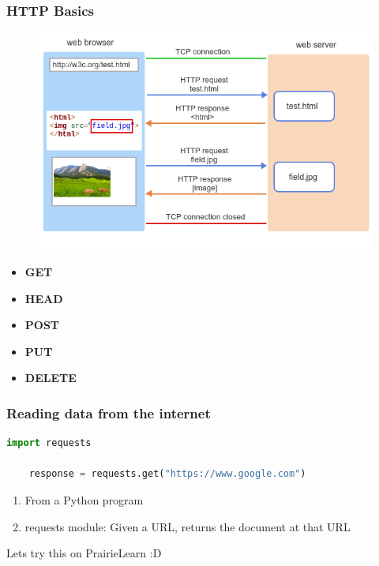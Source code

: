 \documentclass{beamer}
\begin{document}
%
%
\begin{frame}[fragile]
    \frametitle{HTTP Basics}
    \begin{minipage}{0.49\textwidth}
        \begin{figure}
            \includegraphics[width=\textwidth]{./imgs/httprequest.png}
        \end{figure}
    \end{minipage}
    \begin{minipage}{0.49\textwidth}
        \begin{itemize}
            \item \textbf{GET} \textrightarrow \
            \item \textbf{HEAD} \textrightarrow \
            \item \textbf{POST} \textrightarrow \
            \item \textbf{PUT} \textrightarrow \
            \item \textbf{DELETE} \textrightarrow \
        \end{itemize}
    \end{minipage}
\end{frame}

%
%
\begin{frame}[fragile]
    \frametitle{Reading data from the internet}
    \begin{lstlisting}[language=Python, autogobble]
    import requests

    response = requests.get("https://www.google.com")
    \end{lstlisting} 
    \vfill
    \begin{enumerate}[A]
        \item From a Python program
        \item requests module: Given a URL, returns the document at that URL
    \end{enumerate}
    \pause
    Lets try this on PrairieLearn :D 
\end{frame}
\end{document}
